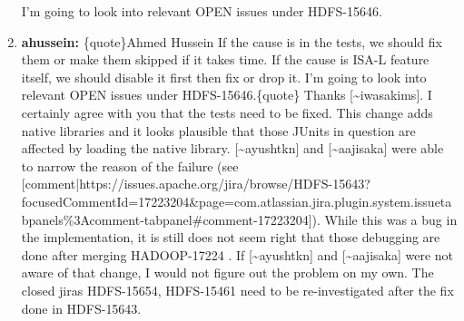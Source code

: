 \documentclass{report}%
\begin{document}
\begin{enumerate}
\newline%
\newline%
\newline%
I'm going to look into relevant OPEN issues under HDFS{-}15646.\newline%
\newline%
%
\item%
\textbf{ahussein: }\{quote\}Ahmed Hussein If the cause is in the tests, we should fix them or make them skipped if it takes time. If the cause is ISA{-}L feature itself, we should disable it first then fix or drop it.\newline%
\newline%
I'm going to look into relevant OPEN issues under HDFS{-}15646.\{quote\}\newline%
\newline%
\newline%
\newline%
Thanks {[}\textasciitilde{}iwasakims{]}. I certainly agree with you that the tests need to be fixed.\newline%
\newline%
\newline%
\newline%
This change adds native libraries and it looks plausible that those JUnits in question are affected by loading the native library.\newline%
\newline%
{[}\textasciitilde{}ayushtkn{]} and {[}\textasciitilde{}aajisaka{]} were able to narrow the reason of the failure (see {[}comment|https://issues.apache.org/jira/browse/HDFS{-}15643?focusedCommentId=17223204\&page=com.atlassian.jira.plugin.system.issuetabpanels\%3Acomment{-}tabpanel\#comment{-}17223204{]}).\newline%
\newline%
While this was a bug in the implementation, it is still does not seem right that those debugging are done after merging HADOOP{-}17224 .\newline%
\newline%
If {[}\textasciitilde{}ayushtkn{]} and {[}\textasciitilde{}aajisaka{]} were not aware of that change, I would not figure out the problem on my own.\newline%
\newline%
\newline%
\newline%
The closed jiras HDFS{-}15654, HDFS{-}15461  need to be re{-}investigated after the fix done in HDFS{-}15643.\newline%

\end{enumerate}
\end{document}
